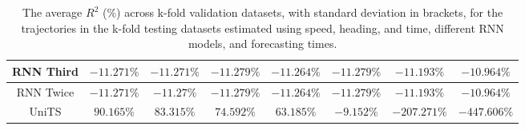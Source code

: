 \begin{table}[!ht]
{\begin{tabular}{|c|c|c|c|c|c|c|c|}
			RNN Third & $-11.271\%$ & $-11.271\%$ & $-11.279\%$ & $-11.264\%$ & $-11.279\%$ & $-11.193\%$ & $-10.964\%$ \\ \hline
			RNN Twice & $-11.271\%$ & $-11.27\%$ & $-11.279\%$ & $-11.264\%$ & $-11.279\%$ & $-11.193\%$ & $-10.964\%$ \\ \hline
			UniTS & $90.165\%$ & $83.315\%$ & $74.592\%$ & $63.185\%$ & $-9.152\%$ & $-207.271\%$ & $-447.606\%$ \\ \hline
		\end{tabular}
	}
	\caption{The average $R^{2}$ (\%) across k-fold validation datasets, with standard deviation in brackets, for the trajectories in the k-fold testing datasets estimated using speed, heading, and time, different RNN models, and forecasting times.}
	\label{tab:all_speed_actual_dir_R2}
\end{table}

